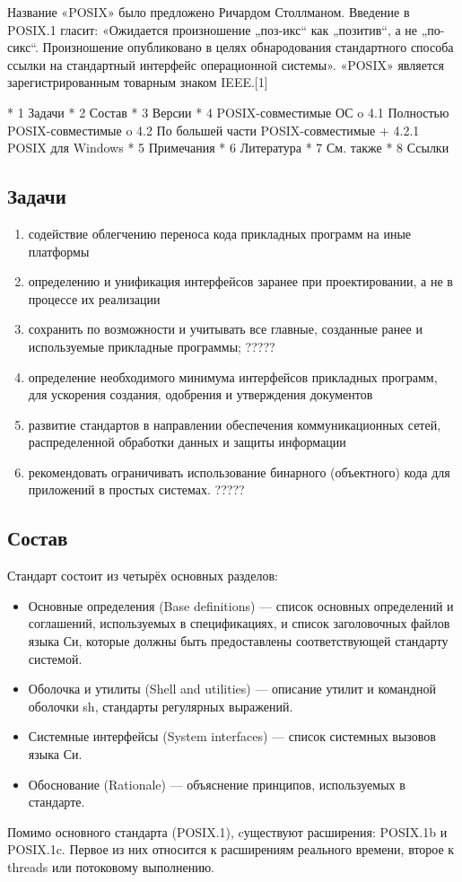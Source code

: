 Название «POSIX» было предложено Ричардом Столлманом. Введение в POSIX.1 гласит: «Ожидается произношение „поз-икс“ как „позитив“, а не „по-сикс“. Произношение опубликовано в целях обнародования стандартного способа ссылки на стандартный интерфейс операционной системы». «POSIX» является зарегистрированным товарным знаком IEEE.[1]

    * 1 Задачи
    * 2 Состав
    * 3 Версии
    * 4 POSIX-совместимые ОС
          o 4.1 Полностью POSIX-совместимые
          o 4.2 По большей части POSIX-совместимые
                + 4.2.1 POSIX для Windows
    * 5 Примечания
    * 6 Литература
    * 7 См. также
    * 8 Ссылки
\subsection{Задачи}
\begin{enumerate}
\item содействие облегчению переноса кода прикладных программ на иные платформы
\item определению и унификация интерфейсов заранее при проектировании, а не в процессе их реализации
\item сохранить по возможности и учитывать все главные, созданные ранее и используемые прикладные программы; ?????
\item определение необходимого минимума интерфейсов прикладных программ, для ускорения создания, одобрения и утверждения документов
\item развитие стандартов в направлении обеспечения коммуникационных сетей, распределенной обработки данных и защиты информации
\item рекомендовать ограничивать использование бинарного (объектного) кода для приложений в простых системах. ?????
\end{enumerate}
\subsection{Состав}
Стандарт состоит из четырёх основных разделов:

\begin{itemize}
\item Основные определения (Base definitions) — список основных определений и соглашений, используемых в спецификациях, и список заголовочных файлов языка Си, которые должны быть предоставлены соответствующей стандарту системой.
\item Оболочка и утилиты (Shell and utilities) — описание утилит и командной оболочки sh, стандарты регулярных выражений.
\item Системные интерфейсы (System interfaces) — список системных вызовов языка Си.
\item Обоснование (Rationale) — объяснение принципов, используемых в стандарте.
\end{itemize}
Помимо основного стандарта (POSIX.1), cуществуют расширения: POSIX.1b и POSIX.1c. Первое из них относится к расширениям реального времени, второе к threads или потоковому выполнению.

